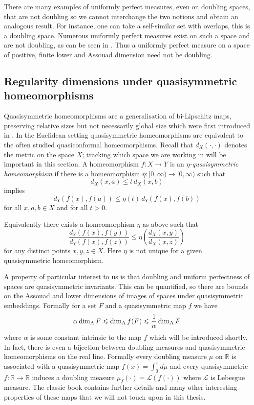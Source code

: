 There are many examples of uniformly perfect measures, even on doubling spaces, that are not doubling so we cannot interchange the two notions and obtain an analogous result.  For instance, one can take a self-similar set with overlaps, this is a doubling space. Numerous uniformly perfect measures exist on such a space and are not doubling, as can be seen in \cite{hare-troscheit}. Thus a uniformly perfect measure on a space of positive, finite lower and Assouad dimension need not be doubling.




\subsection{Regularity dimensions under quasisymmetric homeomorphisms}\label{ch-quantifying:sec:quasi}


Quasisymmetric homeomorphisms are a generalisation of bi-Lipschitz maps, preserving relative sizes but not necessarily global size which were first introduced in \cite{ahlfors-beurling, tukia-vaisala}. In the Euclidean setting quasisymmetric homeomorphisms are equivalent to the often studied quasiconformal homeomorphisms. Recall that $d_X(\cdot,\cdot)$ denotes the metric on the space $X$; tracking which space we are working in will be important in this section. A homeomorphism $f\colon X \rightarrow Y$ is an \textit{$\eta$-quasisymmetric homeomorphism} if there is a homeomorphism $\eta \colon [0,\infty) \rightarrow [0,\infty)$ such that 
\[
d_X( x , a ) \le t \, d_X( x , b )
\]
implies 
\[
d_Y( f(x) , f(a) ) \le \eta(t) \, d_Y ( f(x) , f(b) )
\]
for all $x,a,b \in X$ and for all $t>0$.

Equivalently there exists a homeomorphism $\eta$ as above such that 
\[
\frac{d_Y(f(x),f(y))}{d_Y(f(x),f(z))} \le \eta \left(\frac{d_X(x,y)}{d_X(x,z)} \right)
\]
for any distinct points $x,y,z \in X$. Here $\eta$ is not unique for a given quasisymmetric homeomorphism. 


A property of particular interest to us is that doubling and uniform perfectness of spaces are quasisymmetric invariants. This can be quantified, so there are bounds on the Assouad and lower dimensions of images of spaces under quasisymmetric embeddings. Formally for a set $F$ and a quasisymmetric map $f$ we have
\[
\alpha \dim_{\textup{A}} F \leqslant \dim_{\textup{A}} f(F) \leqslant \frac{1}{\alpha} \dim_{\textup{A}} F
\]
where $\alpha$ is some constant intrinsic to the map $f$ which will be introduced shortly. In fact, there is even a bijection between doubling measures and quasisymmetric homeomorphisms on the real line. Formally every doubling measure $\mu$ on $\mathbb{R}$ is associated with a quasisymmetric map $f(x) = \int_{0}^{x}d\mu$ and every quasisymmetric $f \colon \mathbb{R} \rightarrow \mathbb{R}$ induces a doubling measure $\mu_f( \cdot ) = \mathcal{L}(f(\cdot)) $ where $\mathcal{L}$ is Lebesgue measure. The classic book \cite{heinonen} contains further details and many other interesting properties of these maps that we will not touch upon in this thesis.

